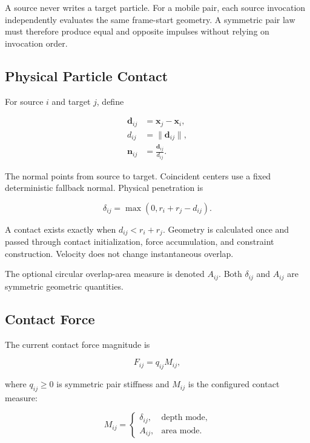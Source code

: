 A source never writes a target particle.  For a mobile pair, each source
invocation independently evaluates the same frame-start geometry.  A symmetric
pair law must therefore produce equal and opposite impulses without relying on
invocation order.

\subsection{Physical Particle Contact}

For source \(i\) and target \(j\), define

\begin{align}
\mathbf d_{ij} &= \mathbf x_j-\mathbf x_i,\\
d_{ij} &= \lVert\mathbf d_{ij}\rVert,\\
\mathbf n_{ij} &= \frac{\mathbf d_{ij}}{d_{ij}}.
\end{align}

The normal points from source to target.  Coincident centers use a fixed
deterministic fallback normal.  Physical penetration is

\begin{equation}
\delta_{ij}=\max(0,r_i+r_j-d_{ij}).
\end{equation}

A contact exists exactly when \(d_{ij}<r_i+r_j\).  Geometry is calculated
once and passed through contact initialization, force accumulation, and
constraint construction.  Velocity does not change instantaneous overlap.

The optional circular overlap-area measure is denoted \(A_{ij}\).  Both
\(\delta_{ij}\) and \(A_{ij}\) are symmetric geometric quantities.

\subsection{Contact Force}

The current contact force magnitude is

\begin{equation}
F_{ij}=q_{ij}M_{ij},
\end{equation}

where \(q_{ij}\geq0\) is symmetric pair stiffness and \(M_{ij}\) is the
configured contact measure:

\begin{equation}
M_{ij}=\begin{cases}
\delta_{ij}, & \text{depth mode},\\
A_{ij}, & \text{area mode}.
\end{cases}
\end{equation}

